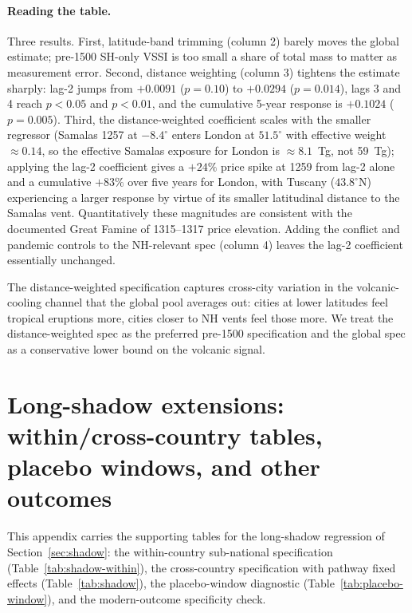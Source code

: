 \documentclass[11pt,letterpaper]{article}
\begin{document}
\paragraph{Reading the table.} Three results. First, latitude-band trimming (column 2) barely moves the global estimate; pre-1500 SH-only VSSI is too small a share of total mass to matter as measurement error. Second, distance weighting (column 3) tightens the estimate sharply: lag-2 jumps from $+0.0091$ ($p=0.10$) to $+0.0294$ ($p=0.014$), lags 3 and 4 reach $p<0.05$ and $p<0.01$, and the cumulative 5-year response is $+0.1024$ ($p=0.005$). Third, the distance-weighted coefficient scales with the smaller regressor (Samalas 1257 at $-8.4^{\circ}$ enters London at $51.5^{\circ}$ with effective weight $\approx 0.14$, so the effective Samalas exposure for London is $\approx 8.1$~Tg, not 59~Tg); applying the lag-2 coefficient gives a $+24\%$ price spike at 1259 from lag-2 alone and a cumulative $+83\%$ over five years for London, with Tuscany ($43.8^{\circ}$N) experiencing a larger response by virtue of its smaller latitudinal distance to the Samalas vent. Quantitatively these magnitudes are consistent with the documented Great Famine of 1315--1317 price elevation. Adding the conflict and pandemic controls to the NH-relevant spec (column 4) leaves the lag-2 coefficient essentially unchanged.

The distance-weighted specification captures cross-city variation in the volcanic-cooling channel that the global pool averages out: cities at lower latitudes feel tropical eruptions more, cities closer to NH vents feel those more. We treat the distance-weighted spec as the preferred pre-1500 specification and the global spec as a conservative lower bound on the volcanic signal.

\section{Long-shadow extensions: within/cross-country tables, placebo windows, and other outcomes}
\label{app:longshadow-extensions}

This appendix carries the supporting tables for the long-shadow regression of Section~\ref{sec:shadow}: the within-country sub-national specification (Table~\ref{tab:shadow-within}), the cross-country specification with pathway fixed effects (Table~\ref{tab:shadow}), the placebo-window diagnostic (Table~\ref{tab:placebo-window}), and the modern-outcome specificity check.
\end{document}

